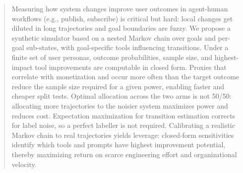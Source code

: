\begin{abstract}
Measuring how system changes improve user outcomes in agent-human workflows (e.g., publish, subscribe) is critical but hard: local changes get diluted in long trajectories and goal boundaries are fuzzy. We propose a synthetic simulator based on a nested Markov chain over goals and per-goal sub-states, with goal-specific tools influencing transitions. Under a finite set of user personas, outcome probabilities, sample size, and highest-impact tool improvements are computable in closed form. Proxies that correlate with monetization and occur more often than the target outcome reduce the sample size required for a given power, enabling faster and cheaper split tests. Optimal allocation across the two arms is not 50/50: allocating more trajectories to the noisier system maximizes power and reduces cost. Expectation maximization for transition estimation corrects for label noise, so a perfect labeller is not required. Calibrating a realistic Markov chain to real trajectories yields leverage: closed-form sensitivities identify which tools and prompts have highest improvement potential, thereby maximizing return on scarce engineering effort and organizational velocity.
\end{abstract}

